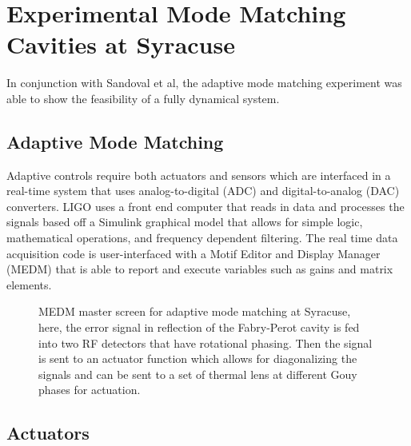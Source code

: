 \chapter{Experimental Mode Matching Cavities at Syracuse}
In conjunction with Sandoval et al, the adaptive mode matching  experiment was able to show the feasibility of a fully dynamical system.
	\section{Adaptive Mode Matching}
	Adaptive controls require both actuators and sensors which are interfaced in a real-time system that uses analog-to-digital (ADC) and digital-to-analog (DAC) converters.  LIGO uses a front end computer that reads in data and processes the signals based off a Simulink graphical model that allows for simple logic, mathematical operations, and frequency dependent filtering.  The real time data acquisition code is user-interfaced with a Motif Editor and Display Manager (MEDM) that is able to report and execute variables such as gains and matrix elements.
	
	\begin{figure}[h]
		\centering
		\caption{MEDM master screen for adaptive mode matching at Syracuse, here, the error signal in reflection of the Fabry-Perot cavity is fed into two RF detectors that have rotational phasing. Then the signal is sent to an actuator function which allows for diagonalizing the signals and can be sent to a set of thermal lens at different Gouy phases for actuation. }
		\label{fig:AMM_Master}
	\end{figure}
	
	\section{Actuators}
